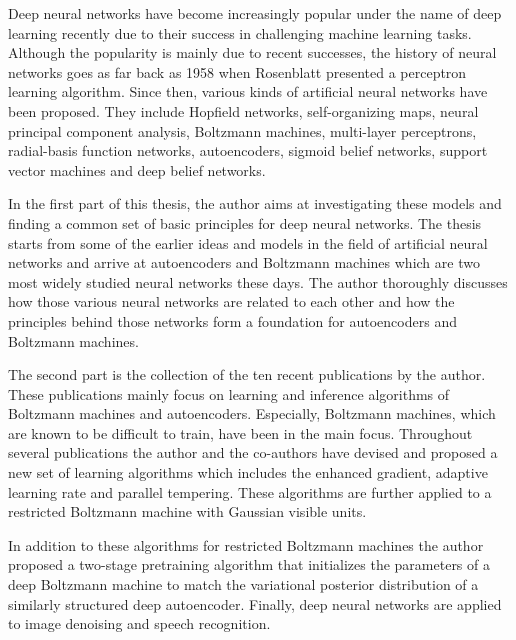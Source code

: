 Deep neural networks have become increasingly popular
under the name of deep learning recently due to their
success in challenging machine learning tasks.  Although the
popularity is mainly due to recent successes, the
history of neural networks goes as far back as 1958 when
Rosenblatt presented a perceptron learning algorithm.  Since
then, various kinds of artificial neural networks have been
proposed. They include Hopfield networks, self-organizing
maps, neural principal component analysis, Boltzmann
machines, multi-layer perceptrons, radial-basis function
networks, autoencoders, sigmoid belief networks, support
vector machines and deep belief networks.

In the first part of this thesis, the author aims at
investigating these models and finding a common set of basic
principles for deep neural networks. The thesis starts from
some of the earlier ideas and models in the field of
artificial neural networks and arrive at autoencoders and
Boltzmann machines which are two most widely studied neural
networks these days. The author thoroughly discusses how
those various neural networks are related to each other and
how the principles behind those networks form a foundation for
autoencoders and Boltzmann machines. 

The second part is the collection of the ten recent
publications by the author. These publications mainly focus
on learning and inference algorithms of Boltzmann machines
and autoencoders. Especially, Boltzmann machines, which are
known to be difficult to train, have been in the main focus.
Throughout several publications the author and the
co-authors have devised and proposed a new set of learning
algorithms which includes the enhanced gradient, adaptive
learning rate and parallel tempering. These algorithms are
further applied to a restricted Boltzmann machine with
Gaussian visible units.

In addition to these algorithms for restricted Boltzmann
machines the author proposed a two-stage pretraining
algorithm that initializes the parameters of a deep
Boltzmann machine to match the variational posterior
distribution of a similarly structured deep autoencoder.
Finally, deep neural networks are applied to image denoising
and speech recognition.






